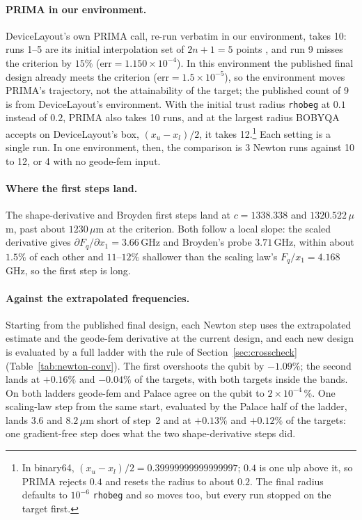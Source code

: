 \documentclass{anvil-paper}
\begin{document}
\paragraph{PRIMA in our environment.}
DeviceLayout's own PRIMA call,
re-run verbatim in our environment, takes 10: runs 1--5 are its initial
interpolation set of $2n+1 = 5$ points \citep{powell2009bobyqa}, and run 9
misses the criterion by $15\%$ ($\mathrm{err} = 1.150\times10^{-4}$). In
this environment the published final design already meets the criterion
($\mathrm{err} = 1.5\times10^{-5}$), so the environment moves PRIMA's
trajectory, not the attainability of the target; the published count of 9
is from DeviceLayout's environment. With the initial trust radius
\texttt{rhobeg} at $0.1$ instead of $0.2$, PRIMA also takes 10 runs, and
at the largest radius BOBYQA accepts on DeviceLayout's box, $(x_u -
x_l)/2$, it takes 12.\footnote{In binary64, $(x_u - x_l)/2 =
0.39999999999999997$; $0.4$ is one ulp above it, so PRIMA rejects $0.4$ and
resets the radius to about $0.2$. The final radius defaults to $10^{-6}$
\texttt{rhobeg} and so moves too, but every run stopped on the target
first.} Each setting is a single run. In one environment, then, the
comparison is 3 Newton runs against 10 to 12, or 4 with no geode-fem input.

\paragraph{Where the first steps land.}
The shape-derivative and Broyden first steps land at $c = 1338.338$ and
$1320.522\,\mu$m, past about $1230\,\mu$m at the criterion. Both follow a
local slope: the scaled derivative gives $\partial F_q/\partial x_1 =
3.66$\,GHz and Broyden's probe $3.71$\,GHz, within about $1.5\%$ of each
other and $11$--$12\%$ shallower than the scaling law's $F_q/x_1 =
4.168$\,GHz, so the first step is long.

\paragraph{Against the extrapolated frequencies.}
Starting from the published final design, each Newton step uses the
extrapolated estimate and the geode-fem derivative at the current design,
and each new design is evaluated by a full ladder with the rule of
Section~\ref{sec:crosscheck} (Table~\ref{tab:newton-conv}).
The first overshoots the qubit by $-1.09\%$; the second lands at $+0.16\%$
and $-0.04\%$ of the targets, with both targets inside the bands. On both
ladders geode-fem and Palace agree on the qubit to $2\times10^{-4}\,\%$.
One scaling-law step from the same start, evaluated by the Palace half of
the ladder, lands $3.6$ and $8.2\,\mu$m short of step~2 and at $+0.13\%$
and $+0.12\%$ of the targets: one gradient-free step does what the two
shape-derivative steps did.
\end{document}
